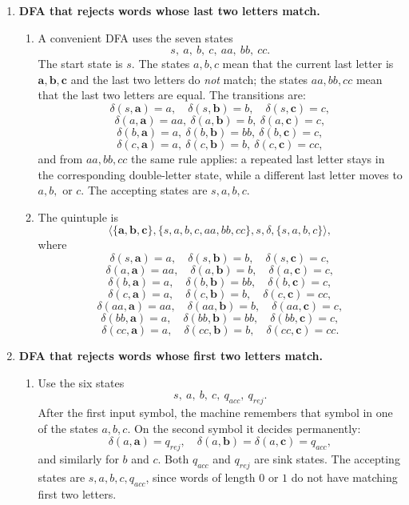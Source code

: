 \documentclass[11pt,openany]{book}
\begin{document}
\begin{enumerate}[{1.}1.]
\item \textbf{DFA that rejects words whose last two letters match.}

\begin{enumerate}
\item A convenient DFA uses the seven states
\[
s,\ a,\ b,\ c,\ aa,\ bb,\ cc.
\]
The start state is $s$. The states $a,b,c$ mean that the current last letter is $\pmb{a},\pmb{b},\pmb{c}$ and the last two letters do \emph{not} match; the states $aa,bb,cc$ mean that the last two letters are equal. The transitions are:
\[
\delta(s,\pmb{a})=a,\quad \delta(s,\pmb{b})=b,\quad \delta(s,\pmb{c})=c,
\]
\[
\delta(a,\pmb{a})=aa,\ \delta(a,\pmb{b})=b,\ \delta(a,\pmb{c})=c,
\]
\[
\delta(b,\pmb{a})=a,\ \delta(b,\pmb{b})=bb,\ \delta(b,\pmb{c})=c,
\]
\[
\delta(c,\pmb{a})=a,\ \delta(c,\pmb{b})=b,\ \delta(c,\pmb{c})=cc,
\]
and from $aa,bb,cc$ the same rule applies: a repeated last letter stays in the corresponding double-letter state, while a different last letter moves to $a,b,$ or $c$.
The accepting states are $s,a,b,c$.

\item The quintuple is
\[
\langle\{\pmb{a},\pmb{b},\pmb{c}\},\{s,a,b,c,aa,bb,cc\},s,\delta,\{s,a,b,c\}\rangle,
\]
where
\[
\delta(s,\pmb{a})=a,\quad \delta(s,\pmb{b})=b,\quad \delta(s,\pmb{c})=c,
\]
\[
\delta(a,\pmb{a})=aa,\quad \delta(a,\pmb{b})=b,\quad \delta(a,\pmb{c})=c,
\]
\[
\delta(b,\pmb{a})=a,\quad \delta(b,\pmb{b})=bb,\quad \delta(b,\pmb{c})=c,
\]
\[
\delta(c,\pmb{a})=a,\quad \delta(c,\pmb{b})=b,\quad \delta(c,\pmb{c})=cc,
\]
\[
\delta(aa,\pmb{a})=aa,\quad \delta(aa,\pmb{b})=b,\quad \delta(aa,\pmb{c})=c,
\]
\[
\delta(bb,\pmb{a})=a,\quad \delta(bb,\pmb{b})=bb,\quad \delta(bb,\pmb{c})=c,
\]
\[
\delta(cc,\pmb{a})=a,\quad \delta(cc,\pmb{b})=b,\quad \delta(cc,\pmb{c})=cc.
\]
\end{enumerate}

\item \textbf{DFA that rejects words whose first two letters match.}

\begin{enumerate}
\item Use the six states
\[
s,\ a,\ b,\ c,\ q_{acc},\ q_{rej}.
\]
After the first input symbol, the machine remembers that symbol in one of the states $a,b,c$. On the second symbol it decides permanently:
\[
\delta(a,\pmb{a})=q_{rej},\quad \delta(a,\pmb{b})=\delta(a,\pmb{c})=q_{acc},
\]
and similarly for $b$ and $c$. Both $q_{acc}$ and $q_{rej}$ are sink states. The accepting states are $s,a,b,c,q_{acc}$, since words of length $0$ or $1$ do not have matching first two letters.


\end{enumerate}
\end{enumerate}
\end{document}
